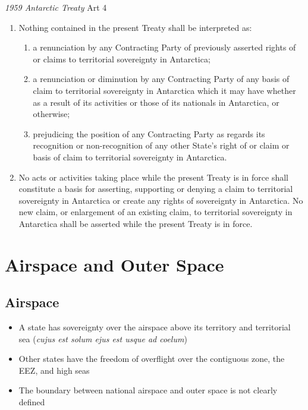 \begin{conventiondetails}{\textit{1959 Antarctic Treaty} Art 4}
    \flushleft 
    \begin{enumerate}
        \item Nothing contained in the present Treaty shall be interpreted as:
        \begin{enumerate}[label=(\alph*)]
            \item a renunciation by any Contracting Party of previously asserted rights of or claims to territorial sovereignty in Antarctica;
            \item a renunciation or diminution by any Contracting Party of any basis of claim to territorial sovereignty in Antarctica which it may have whether as a result of its activities or those of its nationals in Antarctica, or otherwise;
            \item prejudicing the position of any Contracting Party as regards its recognition or non-recognition of any other State's right of or claim or basis of claim to territorial sovereignty in Antarctica.
        \end{enumerate}
        \item No acts or activities taking place while the present Treaty is in force shall 
        constitute a basis for asserting, supporting or denying a claim to territorial 
        sovereignty in Antarctica or create any rights of sovereignty in Antarctica. No new 
        claim, or enlargement of an existing claim, to territorial sovereignty in Antarctica 
        shall be asserted while the present Treaty is in force.
    \end{enumerate}
\end{conventiondetails}

\section{Airspace and Outer Space}

\subsection{Airspace}
\begin{itemize}
    \item A state has sovereignty over the airspace above its territory and territorial sea (\textit{cujus est solum ejus est usque ad coelum})
    \item Other states have the freedom of overflight over the contiguous zone, the EEZ, and high seas
    \item The boundary between national airspace and outer space is not clearly defined
\end{itemize}

